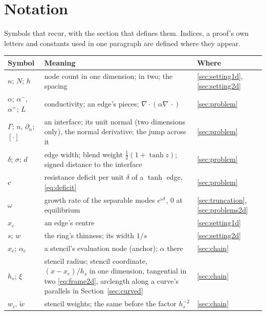 \documentclass[11pt]{amsart}
\theoremstyle{definition}
\theoremstyle{remark}
\begin{document}
\section{Notation}
\label{sec:notation}
Symbols that recur, with the section that defines them. Indices, a proof's
own letters and constants used in one paragraph are defined where they
appear.
\begin{center}
\footnotesize
\begin{tabular}{@{}lp{}l@{}}
\toprule
Symbol & Meaning & Where \\
\midrule
$n$; $N$; $h$ & node count in one dimension; in two; the spacing &
  \ref{sec:setting1d}, \ref{sec:setting2d} \\
$\alpha$; $\alpha^-$, $\alpha^+$; $L$ & conductivity; an edge's pieces;
  $\nabla \cdot (\alpha \nabla\, \cdot)$ & \ref{sec:problem} \\
$\Gamma$; $n$, $\partial_n$; $[\cdot]$ & an interface; its unit normal
  (two dimensions only), the normal derivative; the jump across it &
  \ref{sec:problem} \\
$\delta$; $\sigma$; $d$ & edge width; blend weight
  $\tfrac12 (1 + \tanh z)$; signed distance to the interface &
  \ref{sec:problem} \\
$c$ & resistance deficit per unit $\delta$ of a $\tanh$ edge,
  \eqref{eq:deficit} & \ref{sec:problem} \\
$\omega$ & growth rate of the separable modes $e^{\omega t}$, $0$ at
  equilibrium & \ref{sec:truncation}, \ref{sec:problems2d} \\
$x_c$ & an edge's centre & \ref{sec:setting1d} \\
$s$; $w$ & the ring's thinness; its width $1/s$ & \ref{sec:setting2d} \\
$x_e$; $\alpha_e$ & a stencil's evaluation node (anchor); $\alpha$ there &
  \ref{sec:chain} \\
$h_s$; $\xi$ & stencil radius; stencil coordinate, $(x - x_e) / h_s$ in
  one dimension, tangential in two \eqref{eq:frame2d}, arclength along a
  curve's parallels in Section~\ref{sec:curved} & \ref{sec:chain} \\
$w_i$, $\tilde w$ & stencil weights; the same before the factor
  $h_s^{-2}$ & \ref{sec:chain} \\

\end{tabular}
\end{center}
\end{document}
